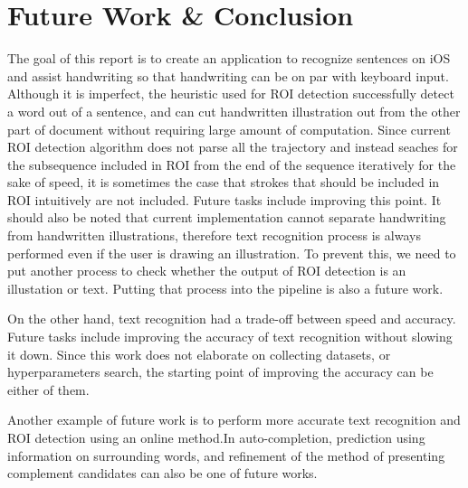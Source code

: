 \section{Future Work \& Conclusion}
\label{section:conclusion}

The goal of this report is to create an application to recognize sentences on iOS
and assist handwriting so that handwriting can be on par with keyboard input.
Although it is imperfect, the heuristic used for ROI detection successfully
detect a word out of a sentence, and can cut handwritten illustration out from the other
part of document without requiring large amount of computation. Since current ROI detection
algorithm does not parse all the trajectory and instead seaches for the subsequence included
in ROI from the end of the sequence iteratively for the sake of speed, it is sometimes the case
that strokes that should be included in ROI intuitively are not included.
Future tasks include improving this point.
It should also be noted that current implementation cannot separate handwriting from handwritten illustrations,
therefore text recognition process is always performed even if the user is drawing an illustration.
To prevent this, we need to put another process to check whether the output of ROI detection is
an illustation or text. Putting that process into the pipeline is also a future work.

On the other hand, text recognition had a trade-off between speed and accuracy.
Future tasks include improving the accuracy of text recognition without slowing it down.
Since this work does not elaborate on collecting datasets, or hyperparameters search,
the starting point of improving the accuracy can be either of them.

Another example of future work is to perform more accurate text recognition and ROI detection
using an online method.In auto-completion, prediction using information on surrounding words,
and refinement of the method of presenting complement candidates can also be one of future works.
